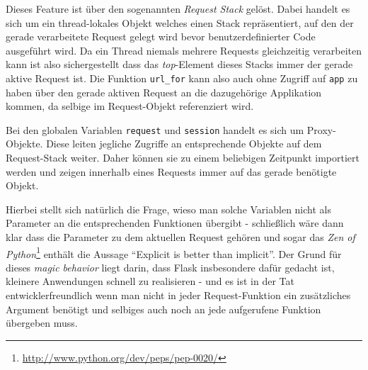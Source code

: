Dieses Feature ist über den sogenannten \emph{Request Stack} gelöst. Dabei handelt es sich um ein
thread-lokales Objekt welches einen Stack repräsentiert, auf den der gerade verarbeitete Request
gelegt wird bevor benutzerdefinierter Code ausgeführt wird. Da ein Thread niemals mehrere Requests
gleichzeitig verarbeiten kann ist also sichergestellt dass das \emph{top}-Element dieses Stacks
immer der gerade aktive Request ist. Die Funktion \lstinline{url_for} kann also auch ohne Zugriff
auf \lstinline{app} zu haben über den gerade aktiven Request an die dazugehörige Applikation kommen,
da selbige im Request-Objekt referenziert wird.

Bei den globalen Variablen \lstinline{request} und \lstinline{session} handelt es sich um
Proxy-Objekte. Diese leiten jegliche Zugriffe an entsprechende Objekte auf dem Request-Stack weiter.
Daher können sie zu einem beliebigen Zeitpunkt importiert werden und zeigen innerhalb eines Requests
immer auf das gerade benötigte Objekt.

Hierbei stellt sich natürlich die Frage, wieso man solche Variablen nicht als Parameter an die
entsprechenden Funktionen übergibt - schließlich wäre dann klar dass die Parameter zu dem aktuellen
Request gehören und sogar das \emph{Zen of
Python}\footnote{\href{http://www.python.org/dev/peps/pep-0020/}{http://www.python.org/dev/peps/pep-0020/}}
enthält die Aussage \enquote{Explicit is better than implicit}. Der Grund für dieses \emph{magic
behavior} liegt darin, dass Flask insbesondere dafür gedacht ist, kleinere Anwendungen schnell zu
realisieren - und es ist in der Tat entwicklerfreundlich wenn man nicht in jeder Request-Funktion
ein zusätzliches Argument benötigt und selbiges auch noch an jede aufgerufene Funktion übergeben
muss.
